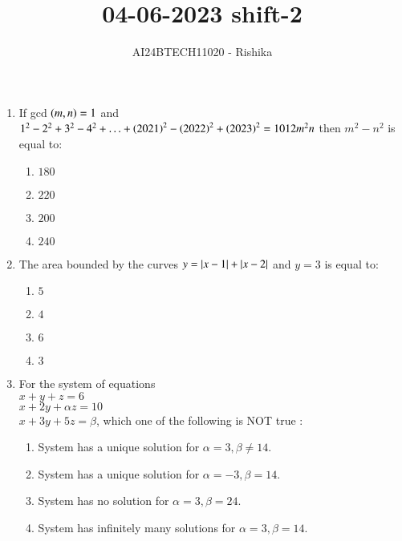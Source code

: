 \documentclass[journal,12pt,onecolumn]{IEEEtran}
\theoremstyle{remark}
\begin{document}

\vspace{3cm}

\title{04-06-2023 shift-2}
\author{AI24BTECH11020 - Rishika}
\maketitle
\bigskip
\renewcommand{\thefigure}{\theenumi}
\renewcommand{\thetable}{\theenumi}
\begin{enumerate}
	\item If gcd $\left(m, n\right) = 1$ and $1^2 - 2^2 + 3^2 - 4^2 + \ldots + \left(2021\right)^2 - \left(2022\right)^2 + \left(2023\right)^2 = 1012 m^2n$ then $m^2 - n^2$ is equal to:
    \begin{enumerate}
        \item $180$
        \item $220$
        \item $200$
        \item $240$
    \end{enumerate}
\item The area bounded by the curves $y = \left\vert x - 1 \right\vert + \left\vert x - 2\right\vert $ and $y = 3$ is equal to:
    \begin{enumerate}
        \item $5$
        \item $4$
        \item $6$
        \item $3$
    \end{enumerate}                                   
\item For the system of equations \\                  
          $x+y+z=6$\\ $x+2y+ \alpha z=10 $ \\ $x+3y+5z=\beta $, which one of the following is NOT true :                                            
    \begin{enumerate}                                                            
        \item System has a unique solution for $\alpha =3, \beta \neq 14.$                            
        \item System has a unique solution for $\alpha = -3, \beta =14.$ 
        \item System has no solution for $\alpha =3, \beta =24.$ 
        \item System has infinitely many solutions for $\alpha =3, \beta =14.$                        
    \end{enumerate}                          

\end{enumerate}
\end{document}
